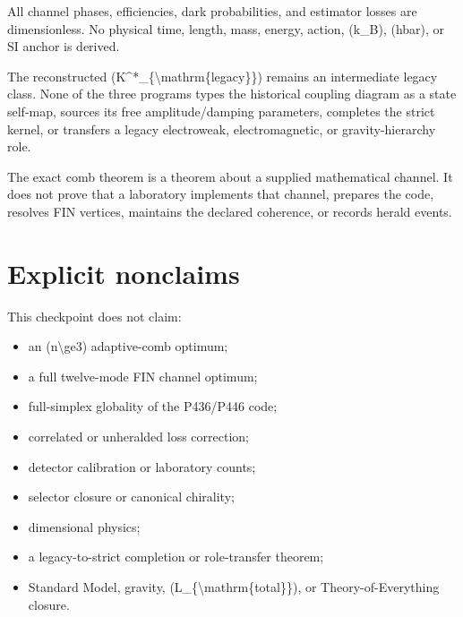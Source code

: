 \documentclass[11pt,a4paper,openany]{report}
\begin{document}
All channel phases, efficiencies, dark probabilities, and estimator losses are dimensionless. No physical time, length, mass, energy, action, (k\_B), (hbar), or SI anchor is derived.

The reconstructed (K\textasciicircum{}*\_\{\textbackslash{}mathrm\{legacy\}\}) remains an intermediate legacy class. None of the three programs types the historical coupling diagram as a state self-map, sources its free amplitude/\allowbreak{}damping parameters, completes the strict kernel, or transfers a legacy electroweak, electromagnetic, or gravity-hierarchy role.

The exact comb theorem is a theorem about a supplied mathematical channel. It does not prove that a laboratory implements that channel, prepares the code, resolves FIN vertices, maintains the declared coherence, or records herald events.

\chapter{Explicit nonclaims}

This checkpoint does not claim:

\begin{itemize}
\item 
an (n\textbackslash{}ge3) adaptive-comb optimum;

\item 
a full twelve-mode FIN channel optimum;

\item 
full-simplex globality of the P436/\allowbreak{}P446 code;

\item 
correlated or unheralded loss correction;

\item 
detector calibration or laboratory counts;

\item 
selector closure or canonical chirality;

\item 
dimensional physics;

\item 
a legacy-to-strict completion or role-transfer theorem;

\item 
Standard Model, gravity, (L\_\{\textbackslash{}mathrm\{total\}\}), or Theory-of-Everything closure.

\end{itemize}
\end{document}
